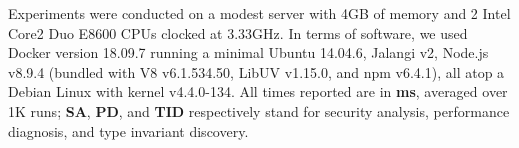 \documentclass[letterpaper,twocolumn,10pt]{article}
\begin{document}
Experiments were conducted on a modest server with 4GB of memory and 2 Intel Core2 Duo E8600 CPUs clocked at 3.33GHz.
In terms of software, we used Docker version 18.09.7 running a minimal Ubuntu 14.04.6, Jalangi v2, Node.js v8.9.4 (bundled with V8 v6.1.534.50, LibUV v1.15.0, and npm v6.4.1), all atop a Debian Linux with kernel v4.4.0-134.
All times reported are in \textbf{ms}, averaged over 1K runs;
  \textbf{SA}, \textbf{PD}, and \textbf{TID} respectively stand for security analysis, performance diagnosis, and type invariant discovery.
  

\end{document}
